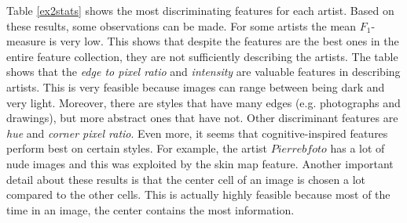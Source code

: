 Table \ref{ex2stats} shows the most discriminating features for each artist. 
Based on these results, some observations can be made.
For some artists the mean $F_1$-measure is very low. This shows that despite the features are the best ones in the entire feature collection, they are not sufficiently describing the artists.
The table shows that the \textit{edge to pixel ratio} and \textit{intensity} are valuable features in describing artists.
This is very feasible because images can range between being dark and very light. Moreover, there are styles that have many edges (e.g. photographs and drawings), but more abstract ones that have not.
Other discriminant features are \textit{hue} and \textit{corner pixel ratio}.
Even more, it seems that cognitive-inspired features perform best on certain styles.
For example, the artist $Pierrebfoto$ has a lot of nude images and this was exploited by the skin map feature.
Another important detail about these results is that the center cell of an image is chosen a lot compared to the other cells.
This is actually highly feasible because most of the time in an image, the center contains the most information.